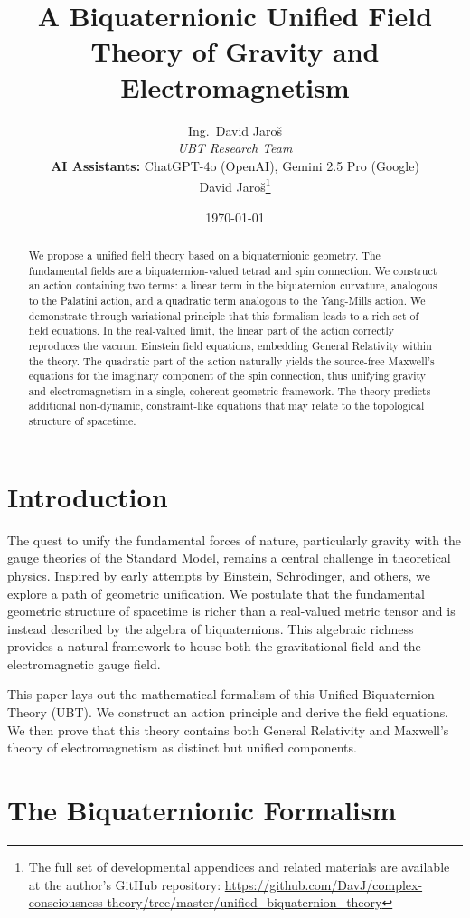 \documentclass[11pt, a4paper]{article}
\title{\textbf{A Biquaternionic Unified Field Theory of Gravity and Electromagnetism}}
\author{
Ing.~David Jaroš \\
\textit{UBT Research Team} \\
\textbf{AI Assistants:} ChatGPT-4o (OpenAI), Gemini 2.5 Pro (Google) \\
David Jaroš\thanks{The full set of developmental appendices and related materials are available at the author's GitHub repository: \url{https://github.com/DavJ/complex-consciousness-theory/tree/master/unified_biquaternion_theory}}}
\affil{Independent Researcher}
\date{\today}
\begin{document}
\maketitle

\begin{abstract}
We propose a unified field theory based on a biquaternionic geometry. The fundamental fields are a biquaternion-valued tetrad and spin connection. We construct an action containing two terms: a linear term in the biquaternion curvature, analogous to the Palatini action, and a quadratic term analogous to the Yang-Mills action. We demonstrate through variational principle that this formalism leads to a rich set of field equations. In the real-valued limit, the linear part of the action correctly reproduces the vacuum Einstein field equations, embedding General Relativity within the theory. The quadratic part of the action naturally yields the source-free Maxwell's equations for the imaginary component of the spin connection, thus unifying gravity and electromagnetism in a single, coherent geometric framework. The theory predicts additional non-dynamic, constraint-like equations that may relate to the topological structure of spacetime.
\end{abstract}

\tableofcontents

\section{Introduction}
The quest to unify the fundamental forces of nature, particularly gravity with the gauge theories of the Standard Model, remains a central challenge in theoretical physics. Inspired by early attempts by Einstein, Schrödinger, and others, we explore a path of geometric unification. We postulate that the fundamental geometric structure of spacetime is richer than a real-valued metric tensor and is instead described by the algebra of biquaternions. This algebraic richness provides a natural framework to house both the gravitational field and the electromagnetic gauge field.

This paper lays out the mathematical formalism of this Unified Biquaternion Theory (UBT). We construct an action principle and derive the field equations. We then prove that this theory contains both General Relativity and Maxwell's theory of electromagnetism as distinct but unified components.

\section{The Biquaternionic Formalism}
\end{document}
